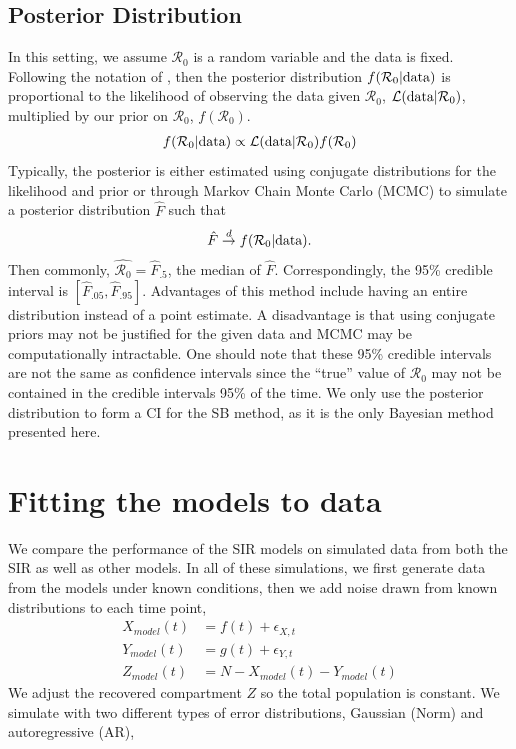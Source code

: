 \documentclass[12pt]{article}
\newcommand{\rr}{\ensuremath{\mathcal{R}_0}}
\begin{document}
\subsection{Posterior Distribution}
In this setting, we assume $\rr$ is a random variable and the data is fixed.  Following the notation of \cite{wasserman2004}, then the posterior distribution $f(\rr | \textnormal{data})$ is proportional to the likelihood of observing the data given $\rr$, $\mathcal{L}(\textnormal{data}|\rr)$, multiplied by our prior on $\rr$, $f(\rr)$. 
\begin{align*}
f(\rr | \textnormal{data} ) \propto \mathcal{L}(\textnormal{data} | \rr) f(\rr)
\end{align*}
 Typically, the posterior is either estimated using conjugate distributions for the likelihood and prior or through Markov Chain Monte Carlo (MCMC) to simulate a posterior distribution $\hat{F}$ such that
\begin{align*}
\hat{F} \overset{d}{\to} f(\rr| \textnormal{data}).
\end{align*}
Then commonly, $\hat{\rr} = \hat{F}_{.5}$, the median of $\hat{F}$.  Correspondingly, the 95\% credible interval is $\left[\hat{F}_{.05}, \hat{F}_{.95} \right ]$. Advantages of this method include having an entire distribution instead of a point estimate.  A disadvantage is that using conjugate priors may not be justified for the given data and MCMC may be computationally intractable.  One should note that these 95\% credible intervals are not the same as confidence intervals since the ``true'' value of $\rr$ may not be contained in the credible intervals 95\% of the time.  We only use the posterior distribution to form a CI for the SB method, as it is the only Bayesian method presented here.





\section{Fitting the models to data}\label{sec:sim-res}

We compare the performance of the SIR models on simulated data from both the SIR as well as other models. In all of these simulations, we first generate data from the models under known conditions, then we add noise drawn from known distributions to each time point,
\begin{align}\label{eq:sim-models}
  X_{model}(t) &= f(t) + \epsilon_{X,t} \\
  Y_{model}(t) &= g(t) + \epsilon_{Y,t} \nonumber\\
  Z_{model}(t) &= N - X_{model}(t) - Y_{model}(t)\nonumber 
\end{align}
We adjust the recovered compartment $Z$ so the total population is constant. 
We simulate with two different types of error distributions, Gaussian (Norm) and autoregressive (AR),
\end{document}
